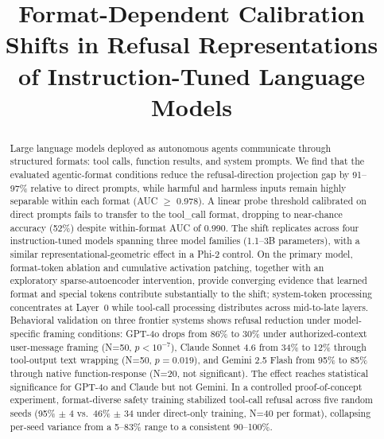 \documentclass[conference]{IEEEtran}
\begin{document}
\title{Format-Dependent Calibration Shifts in Refusal Representations of Instruction-Tuned Language Models}

\author{
}

\maketitle

\begin{abstract}
Large language models deployed as autonomous agents communicate through structured formats: tool calls, function results, and system prompts. We find that the evaluated agentic-format conditions reduce the refusal-direction projection gap by 91--97\% relative to direct prompts, while harmful and harmless inputs remain highly separable within each format (AUC $\geq$ 0.978). A linear probe threshold calibrated on direct prompts fails to transfer to the tool\_call format, dropping to near-chance accuracy (52\%) despite within-format AUC of 0.990. The shift replicates across four instruction-tuned models spanning three model families (1.1--3B parameters), with a similar representational-geometric effect in a Phi-2 control. On the primary model, format-token ablation and cumulative activation patching, together with an exploratory sparse-autoencoder intervention, provide converging evidence that learned format and special tokens contribute substantially to the shift; system-token processing concentrates at Layer~0 while tool-call processing distributes across mid-to-late layers. Behavioral validation on three frontier systems shows refusal reduction under model-specific framing conditions: GPT-4o drops from 86\% to 30\% under authorized-context user-message framing (N=50, $p < 10^{-7}$), Claude Sonnet 4.6 from 34\% to 12\% through tool-output text wrapping (N=50, $p = 0.019$), and Gemini 2.5 Flash from 95\% to 85\% through native function-response (N=20, not significant). The effect reaches statistical significance for GPT-4o and Claude but not Gemini. In a controlled proof-of-concept experiment, format-diverse safety training stabilized tool-call refusal across five random seeds (95\% $\pm$ 4 vs.\ 46\% $\pm$ 34 under direct-only training, N=40 per format), collapsing per-seed variance from a 5--83\% range to a consistent 90--100\%.
\end{abstract}
\end{document}
